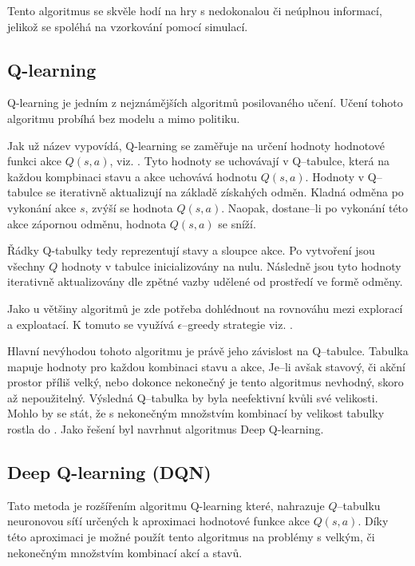 Tento algoritmus se skvěle hodí na hry s nedokonalou či neúplnou informací, jelikož se spoléhá na vzorkování pomocí simulací.

\subsection{Q-learning}\label{subsec:q-learning}

Q-learning je jedním z nejznámějších algoritmů posilovaného učení.
Učení tohoto algoritmu probíhá bez modelu a mimo politiku.

Jak už název vypovídá, Q-learning se zaměřuje na určení hodnoty hodnotové funkci akce $Q(s, a)$, viz. .
Tyto hodnoty se uchovávají v Q--tabulce, která na každou kompbinaci stavu a akce uchovává hodnotu $Q(s, a)$.
Hodnoty v Q--tabulce se iterativně aktualizují na základě získahých odměn.
Kladná odměna po vykonání akce $s$, zvýší se hodnota $Q(s, a)$.
Naopak, dostane--li po vykonání této akce zápornou odměnu, hodnota $Q(s, a)$ se sníží.

Řádky Q-tabulky tedy reprezentují stavy a sloupce akce.
Po vytvoření jsou všechny $Q$ hodnoty v tabulce inicializovány na nulu.
Následně jsou tyto hodnoty iterativně aktualizovány dle zpětné vazby udělené od prostředí ve formě odměny.

Jako u většiny algoritmů je zde potřeba dohlédnout na rovnováhu mezi explorací a exploatací.
K tomuto se využívá $\epsilon$--greedy strategie viz. .

Hlavní nevýhodou tohoto algoritmu je právě jeho závislost na Q--tabulce.
Tabulka mapuje hodnoty pro každou kombinaci stavu a akce,
Je--li avšak stavový, či akční prostor příliš velký, nebo dokonce nekonečný je tento algoritmus nevhodný, skoro až nepoužitelný.
Výsledná Q--tabulka by byla neefektivní kvůli své velikosti.
Mohlo by se stát, že s nekonečným množstvím kombinací by velikost tabulky rostla do .
Jako řešení byl navrhnut algoritmus Deep Q-learning.

\subsection{Deep Q-learning (DQN)}\label{subsec:deep-q-learning}

Tato metoda je rozšířením algoritmu Q-learning které,
nahrazuje $Q$--tabulku neuronovou síťí určených k aproximaci hodnotové funkce akce $Q(s, a)$.
Díky této aproximaci je možné použít tento algoritmus na problémy s velkým, či nekonečným množstvím kombinací akcí a stavů.

